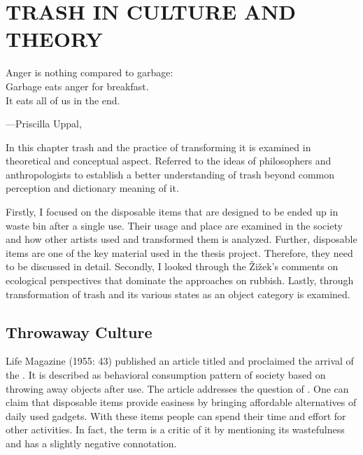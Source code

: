 \chapter{TRASH IN CULTURE AND THEORY}



\begin{singlespace}
\epigraph{Anger is nothing compared to garbage:\\Garbage eats anger for breakfast.\\It eats all of us in the end.}{\hfill---Priscilla Uppal, }
\end{singlespace}



In this chapter trash and the practice of transforming it is examined in theoretical and conceptual aspect. Referred to the ideas of philosophers and anthropologists to establish a better understanding of trash beyond common perception and dictionary meaning of it.

Firstly, I focused on the disposable items that are designed to be ended up in waste bin after a single use. Their usage and place are examined in the society and how other artists used and transformed them is analyzed. Further, disposable items are one of the key material used in the thesis project. Therefore, they need to be discussed in detail. Secondly, I looked through the Žižek’s comments on ecological perspectives that dominate the approaches on rubbish. Lastly, through  transformation of trash and its various states as an object category is examined.



\section{Throwaway Culture}

Life Magazine (1955: 43) published an article titled  and proclaimed the arrival of the . It is described as behavioral consumption pattern of society based on throwing away objects after use. The article addresses the question of  \citep{tully2014throw}. One can claim that disposable items provide easiness by bringing affordable alternatives of daily used gadgets. With these items people can spend their time and effort for other activities. In fact, the term  is a critic of it by mentioning its wastefulness and has a slightly negative connotation.

